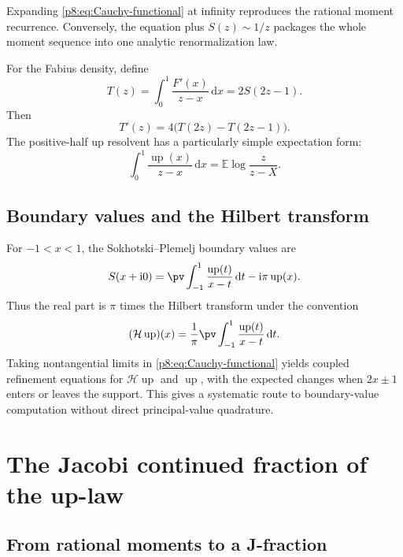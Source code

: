 \documentclass[11pt,oneside]{article}
\theoremstyle{definition}
\theoremstyle{remark}
\newcommand{\Up}{\operatorname{up}}
\newcommand{\E}{\mathbb E}
\newcommand{\dd}{\,\mathrm d}
\newcommand{\ii}{\mathrm i}
\newcommand{\1}{\mathbf 1}
\begin{document}
Expanding \eqref{p8:eq:Cauchy-functional} at infinity reproduces the rational
moment recurrence.  Conversely, the equation plus \(S(z)\sim1/z\) packages the
whole moment sequence into one analytic renormalization law.

For the Fabius density, define
\begin{equation}
 T(z)=\int_0^1\frac{F'(x)}{z-x}\dd x=2S(2z-1).
 \label{p8:eq:F-density-Cauchy}
\end{equation}
Then
\begin{equation}
 T'(z)=4\bigl(T(2z)-T(2z-1)\bigr).
 \label{p8:eq:F-density-Cauchy-functional}
\end{equation}
The positive-half up resolvent has a particularly simple expectation form:
\begin{equation}
 \boxed{
 \int_0^1\frac{\Up(x)}{z-x}\dd x
 =\E\log\frac{z}{z-X}.}
 \label{p8:eq:half-resolvent-log}
\end{equation}

\subsection{Boundary values and the Hilbert transform}

For \(-1<x<1\), the Sokhotski--Plemelj boundary values are
\begin{equation}
 S(x+\ii0)
 =\pv\int_{-1}^1\frac{\Up(t)}{x-t}\dd t-\ii\pi\Up(x).
 \label{p8:eq:Plemelj}
\end{equation}
Thus the real part is \(\pi\) times the Hilbert transform under the convention
\begin{equation}
 (\mathcal H\Up)(x)=\frac1\pi\pv\int_{-1}^1\frac{\Up(t)}{x-t}\dd t.
 \label{p8:eq:Hilbert-def}
\end{equation}
Taking nontangential limits in \eqref{p8:eq:Cauchy-functional} yields coupled
refinement equations for \(\mathcal H\Up\) and \(\Up\), with the expected
changes when \(2x\pm1\) enters or leaves the support.  This gives a systematic
route to boundary-value computation without direct principal-value quadrature.

\section{The Jacobi continued fraction of the up-law}
\label{p8:sec:jacobi}

\subsection{From rational moments to a J-fraction}
\end{document}
